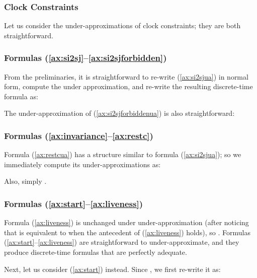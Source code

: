 \documentclass[a4paper]{article}
\newcommand{\frf}[1]{(\ref{#1})}
\newcommand{\fsrf}[2]{(\ref{#1}--\ref{#2})}
\theoremstyle{plain}
\theoremstyle{definition}
\begin{document}
\subsubsection{Clock Constraints}
Let us consider the under-ap\-prox\-i\-ma\-tions of clock constraints; they are both straightforward.






\subsubsection{Formulas \fsrf{ax:si2sj}{ax:si2sjforbidden}}
From the preliminaries, it is straightforward to re-write \frf{ax:si2sjua} in normal form, compute the under approximation, and re-write the resulting discrete-time formula as:


The under-ap\-prox\-i\-ma\-tion of \frf{ax:si2sjforbiddenua} is also straightforward:




\subsubsection{Formulas \fsrf{ax:invariance}{ax:restc}}
Formula \frf{ax:restcua} has a structure similar to formula \frf{ax:si2sjua}; so we immediately compute its under-ap\-prox\-i\-ma\-tions as:


Also, simply .



\subsubsection{Formulas \fsrf{ax:start}{ax:liveness}}
Formula \frf{ax:liveness} is unchanged under under-approximation (after noticing that \linebreak  is equivalent to  when the antecedent of \frf{ax:liveness} holds), so .
Formulas \fsrf{ax:start}{ax:liveness} are straightforward to under-approximate, and they produce discrete-time formulas that are perfectly adequate.

Next, let us consider \frf{ax:start} instead.
Since , we first re-write it as:
\end{document}
